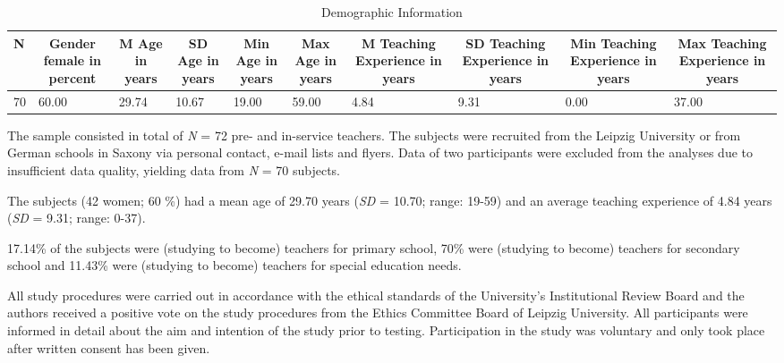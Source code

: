 \documentclass[
  man,floatsintext]{apa6}
\begin{document}
\begin{table}[h]

\begin{center}
\begin{threeparttable}

\caption{\label{tab:demographicstable}Demographic Information}

\tiny{

\begin{tabular}{llllllllll}
\toprule
N & \multicolumn{1}{c}{Gender female in percent} & \multicolumn{1}{c}{M Age in years} & \multicolumn{1}{c}{SD Age in years} & \multicolumn{1}{c}{Min Age in years} & \multicolumn{1}{c}{Max Age in years} & \multicolumn{1}{c}{M Teaching Experience in years} & \multicolumn{1}{c}{SD Teaching Experience in years} & \multicolumn{1}{c}{Min Teaching Experience in years} & \multicolumn{1}{c}{Max Teaching Experience in years}\\
\midrule
70 & 60.00 & 29.74 & 10.67 & 19.00 & 59.00 & 4.84 & 9.31 & 0.00 & 37.00\\
\bottomrule
\end{tabular}

}

\end{threeparttable}
\end{center}

\end{table}

The sample consisted in total of \emph{N} = 72 pre- and in-service teachers. The subjects were recruited from the Leipzig University or from German schools in Saxony via personal contact, e-mail lists and flyers. Data of two participants were excluded from the analyses due to insufficient data quality, yielding data from \emph{N} = 70 subjects.

The subjects (42 women; 60 \%) had a mean age of 29.70 years (\emph{SD} = 10.70; range: 19-59) and an average teaching experience of 4.84 years (\emph{SD} = 9.31; range: 0-37).

17.14\% of the subjects were (studying to become) teachers for primary school, 70\% were (studying to become) teachers for secondary school and 11.43\% were (studying to become) teachers for special education needs.

All study procedures were carried out in accordance with the ethical standards of the University's Institutional Review Board and the authors received a positive vote on the study procedures from the Ethics Committee Board of Leipzig University. All participants were informed in detail about the aim and intention of the study prior to testing. Participation in the study was voluntary and only took place after written consent has been given.
\end{document}
